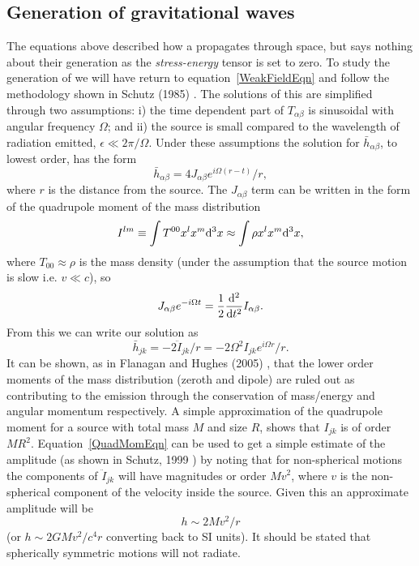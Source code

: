 \subsection{Generation of gravitational waves}
The equations above described how a \gw propagates through space, but says nothing about their
generation as the {\it stress-energy} tensor is set to zero. To study the generation of \gws we
will have return to equation~\ref{WeakFieldEqn} and follow the methodology shown in Schutz (1985)
\cite{Schutz:1985}. The solutions of this are simplified through two assumptions: i) the time
dependent part of $T_{\alpha\beta}$ is sinusoidal with angular frequency $\Omega$; and ii) the
source is small compared to the wavelength of radiation emitted, $\epsilon \ll 2\pi/\Omega$.
Under these assumptions the solution for $\bar{h}_{\alpha\beta}$, to lowest order, has the form
\begin{equation}
\bar{h}_{\alpha\beta} = 4J_{\alpha\beta}e^{i\Omega(r-t)}/r,
\end{equation}
where $r$ is the distance from the source. The $J_{\alpha\beta}$ term can be written in the form of
the quadrupole moment of the mass distribution
\begin{equation}\label{QuadMomDefEqn}
I^{lm} \equiv \int T^{00}x^lx^m{\rm d}^3x \approx \int \rho x^lx^m{\rm d}^3x,
\end{equation}
where $T_{00} \approx \rho$ is the mass density (under the assumption that the source motion is
slow i.e. $v \ll c$), so
\begin{equation}
J_{\alpha\beta}e^{-i\Omega{}t} = \frac{1}{2}\frac{{\rm d}^2}{{\rm d}t^2}I_{\alpha\beta}.
\end{equation}
From this we can write our solution as
\begin{equation}\label{QuadMomEqn}
\bar{h}_{jk} = -2\ddot{I}_{jk}/r = -2\Omega^2I_{jk}e^{i\Omega{}r}/r.
\end{equation}
It can be shown, as in Flanagan and Hughes (2005) \cite{Flanagan:2005}, that the lower order moments
of the mass distribution (zeroth and dipole) are ruled out as contributing to the \gw emission
through the conservation of mass/energy and angular momentum respectively. A simple approximation of
the quadrupole moment for a source with total mass $M$ and size $R$, shows that $I_{jk}$ is of order
$MR^2$. Equation~\ref{QuadMomEqn} can be used to get a simple estimate of the \gw amplitude (as
shown in Schutz, 1999 \cite{Schutz:1999}) by noting that for non-spherical motions the components
of $\ddot{I}_{jk}$ will have magnitudes or order $Mv^2$, where $v$ is the non-spherical component
of the velocity inside the source. Given this an approximate amplitude will be
\begin{equation}\label{SimpleQuadMomEqn}
h \sim 2Mv^2/r
\end{equation}
(or $h \sim 2GMv^2/c^4r$ converting back to SI units). It should be stated that spherically
symmetric motions will not radiate.

